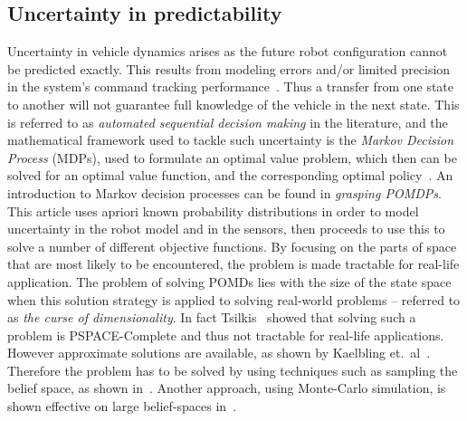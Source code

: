 \subsection{Uncertainty in predictability}
Uncertainty in vehicle dynamics arises as the future robot configuration cannot
be predicted exactly. This results from modeling errors and/or limited precision
in the system's command tracking
performance~\cite{dadkhahSurveyMotionPlanning2012}. Thus a transfer from one
state to another will not guarantee full knowledge of the vehicle in the next
state. This is referred to as \textit{automated sequential decision making} in
the literature, and the mathematical framework used to tackle such uncertainty
is the \textit{Markov Decision Process} (MDPs), used to formulate an optimal
value problem, which then can be solved for an optimal value function, and the
corresponding optimal policy~\cite{Cassandra:1998:EAA:926710}. An introduction
to Markov decision processes can be found in \textit{grasping
  POMDPs}\cite{kaelblingPlanningActingPartially1998}. This article uses apriori
known probability distributions in order to model uncertainty in the robot model
and in the sensors, then proceeds to use this to solve a number of different
objective functions. By focusing on the parts of space that are most likely to
be encountered, the problem is made tractable for real-life application. The
problem of solving POMDs lies with the size of the state space when this
solution strategy is applied to solving real-world problems -- referred to as
\textit{the curse of dimensionality}. In fact
Tsilkis~\cite{christosh.papadimitriouComplexityMarkovDecision1987} showed that
solving such a problem is PSPACE-Complete and thus not tractable for real-life
applications. However approximate solutions are available, as shown by Kaelbling
et.\ al~\cite{kaelblingPlanningActingPartially1998}. Therefore the problem has
to be solved by using techniques such as sampling the belief space, as shown
in~\cite{kearnsSparseSamplingAlgorithm}. Another approach, using Monte-Carlo
simulation, is shown effective on large belief-spaces
in~\cite{silverMonteCarloPlanningLarge}.


